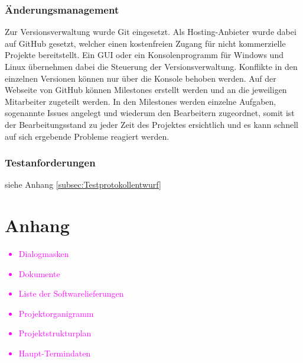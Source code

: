 \subsubsection{Änderungsmanagement}
Zur Versionsverwaltung wurde Git eingesetzt. Als Hosting-Anbieter wurde dabei auf GitHub gesetzt, welcher einen kostenfreien Zugang für nicht kommerzielle Projekte bereitstellt. Ein \ac{GUI} oder ein Konsolenprogramm für Windows und Linux übernehmen dabei die Steuerung der Versionsverwaltung. Konflikte in den einzelnen Versionen können nur über die Konsole behoben werden. Auf der Webseite von GitHub können Milestones erstellt werden und an die jeweiligen Mitarbeiter zugeteilt werden. In den Milestones werden einzelne Aufgaben, sogenannte Issues angelegt und wiederum den Bearbeitern zugeordnet, somit ist der Bearbeitungsstand zu jeder Zeit des Projektes ersichtlich und es kann schnell auf sich ergebende Probleme reagiert werden.



\subsubsection{Testanforderungen}
siehe Anhang \ref{subsec:Testprotokollentwurf}



\section{Anhang}

\textcolor{magenta}{
\begin{itemize}
	\item Dialogmasken
	\item Dokumente
	\item Liste der Softwarelieferungen
	\item Projektorganigramm
	\item Projektstrukturplan
	\item Haupt-Termindaten
\end{itemize}
}